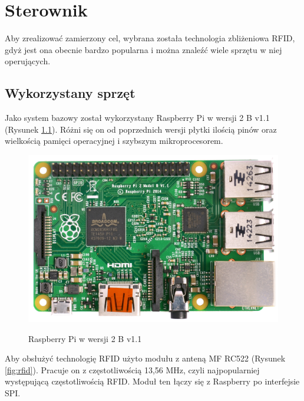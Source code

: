\chapter{Sterownik}

Aby zrealizować zamierzony cel, wybrana została technologia zbliżeniowa RFID, gdyż jest ona obecnie bardzo popularna i można znaleźć wiele sprzętu w niej operujących.

\section{Wykorzystany sprzęt}

Jako system bazowy został wykorzystany Raspberry Pi w wersji 2 B v1.1 (Rysunek \ref{fig:raspberry}). Różni się on od poprzednich wersji płytki ilością pinów oraz wielkością pamięci operacyjnej i szybszym mikroprocesorem.

\begin{figure}[h!]
	\centering
	\includegraphics[width=\linewidth]{img/rasp.jpg}
	\label{fig:raspberry}
	\caption[Raspberry Pi w wersji 2 B v1.1]{Raspberry Pi w wersji 2 B v1.1\footnotemark}
\end{figure}

Aby obsłużyć technologię RFID użyto modułu z anteną MF RC522 (Rysunek \ref{fig:rfid}). Pracuje on z częstotliwością 13,56 MHz, czyli najpopularniej występującą częstotliwością RFID. Moduł ten łączy się z Raspberry po interfejsie SPI.

